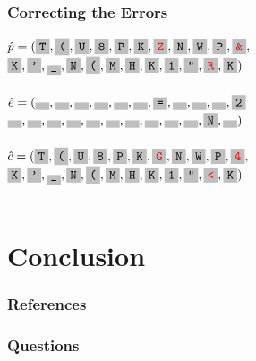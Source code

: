 \documentclass{beamer}
\begin{document}
\begin{frame}
	\frametitle{Correcting the Errors}
    	
	$\hat{p} = (\f{T}, \f{(}, \f{U}, \f{8}, \f{P}, \f{K}, \f{\textcolor{red}{Z}}, \f{N}, \f{W}, \f{P}, \f{\textcolor{red}{\&}}, $\\
    \hspace*{4.5ex}   $\f{K}, \f{'}, \f{\_}, \f{N}, \f{(}, \f{M}, \f{H}, \f{K}, \f{1}, \f{"}, \f{\textcolor{red}{R}}, \f{K})$\\~\\
    
    $\hat{e} = (\f{ }, \f{ }, \f{ }, \f{ }, \f{ }, \f{ }, \f{=}, \f{ }, \f{ }, \f{ }, \f{2}$
    \hspace*{4.5ex} $\f{ }, \f{ }, \f{ }, \f{ }, \f{ }, \f{ }, \f{ }, \f{ }, \f{ }, \f{ }, \f{N}, \f{ })$\\~\\
    
    $\hat{c} = (\f{T}, \f{(}, \f{U}, \f{8}, \f{P}, \f{K}, \f{\textcolor{red}{G}}, \f{N}, \f{W}, \f{P}, \f{\textcolor{red}{4}}, $\\
    \hspace*{4.5ex}   $\f{K}, \f{'}, \f{\_}, \f{N}, \f{(}, \f{M}, \f{H}, \f{K}, \f{1}, \f{"}, \f{\textcolor{red}{<}}, \f{K})$\\~\\

\end{frame}


\section{Conclusion}

\begin{frame} 
        \frametitle{References} 
        
        

\end{frame}

\begin{frame}
	\frametitle{Questions}
\end{frame}
\end{document}
